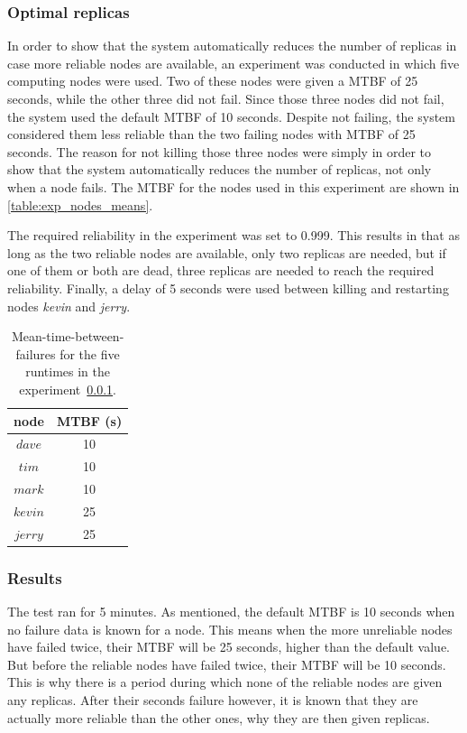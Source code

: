 \documentclass{cslthse-msc}
\begin{document}
\subsubsection{Optimal replicas}
\label{sec:eval_opt_nbr_replicas_2}
In order to show that the system automatically reduces the number of replicas in case more reliable nodes are available, an experiment was conducted in which five computing nodes were used. Two of these nodes were given a MTBF of 25 seconds, while the other three did not fail. Since those three nodes did not fail, the system used the default MTBF of 10 seconds. Despite not failing, the system considered them less reliable than the two failing nodes with MTBF of 25 seconds. The reason for not killing those three nodes were simply in order to show that the system automatically reduces the number of replicas, not only when a node fails. The MTBF for the nodes used in this experiment are shown in \cref{table:exp_nodes_means}.

The required reliability in the experiment was set to 0.999. This results in that as long as the two reliable nodes are available, only two replicas are needed, but if one of them or both are dead, three replicas are needed to reach the required reliability. Finally, a delay of 5 seconds were used between killing and restarting nodes \emph{kevin} and \emph{jerry}.


\begin{table}[h]
	\begin{center}
	\begin{tabular}{| c | c |}
	 \hline
	 node & MTBF (s) \\
	 \hline		
	  $dave$ & 10 \\
	  $tim$ & 10 \\
	  $mark$ & 10 \\
	  $kevin$ & 25 \\
	  $jerry$ & 25 \\
	   \hline
	\end{tabular}
	 \caption{Mean-time-between-failures for the five runtimes in the experiment~\ref{sec:eval_opt_nbr_replicas_2}.}
	 \label{table:exp_nodes_means_2}
	 \end{center}
 \end{table}


\subsubsection*{Results}
The test ran for 5 minutes. As mentioned, the default MTBF is 10 seconds when no failure data is known for a node. This means when the more unreliable nodes have failed twice, their MTBF will be 25 seconds, higher than the default value. But before the reliable nodes have failed twice, their MTBF will be 10 seconds. This is why there is a period during which none of the reliable nodes are given any replicas. After their seconds failure however, it is known that they are actually more reliable than the other ones, why they are then given replicas.
\end{document}
